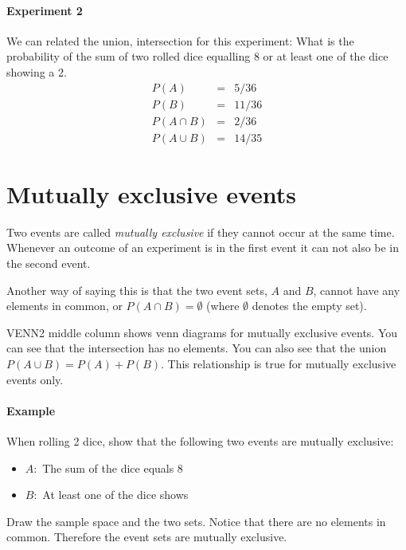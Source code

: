 \documentclass[a4paper,11pt]{report}
\begin{document}
\paragraph{Experiment 2} We can related the union, intersection for
this experiment: What is the probability of the sum of two
rolled dice equalling 8 or at least one of the dice showing a 2.
\begin{eqnarray*}
  P(A) &=& 5/36 \\
  P(B) &=& 11/36 \\
  P(A \cap B) &=& 2/36 \\
  P(A \cup B) &=& 14/35
\end{eqnarray*}

\section{Mutually exclusive events}
Two events are called {\em mutually exclusive} if they cannot occur at
the same time. Whenever an outcome of an experiment is in the first
event it can not also be in the second event.

Another way of saying this is that the two event sets, $A$ and $B$,
cannot have any elements in common, or $P(A \cap B) = \emptyset$
(where $\emptyset$ denotes the empty set).

VENN2 middle column shows venn diagrams for mutually exclusive
events. You can see that the intersection has no elements. You can
also see that the union $P(A \cup B) = P(A) + P(B)$. This relationship
is true for mutually exclusive events only.

\paragraph{Example} When rolling 2 dice, show that the following two
events are mutually exclusive:
\begin{itemize}
\item $A:$ The sum of the dice equals 8
\item $B:$ At least one of the dice shows
\end{itemize}
Draw the sample space and the two sets. Notice that there are no
elements in common. Therefore the event sets are mutually exclusive.
\end{document}
